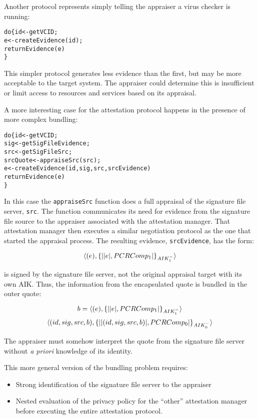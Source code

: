 \documentclass[10pt]{article}
\begin{document}
Another protocol represents simply telling the appraiser a virus
checker is running:

\begin{alltt}
  do \{ id <- getVCID;
       e <- createEvidence(id);
       returnEvidence(e)
  \}
\end{alltt}

This simpler protocol generates less evidence than the first, but may
be more acceptable to the target system.  The appraiser could
determine this is insufficient or limit access to resources and
services based on its appraisal.


A more interesting case for the attestation protocol happens in the
presence of more complex bundling:

\begin{alltt}
  do \{ id <- getVCID;
       sig <- getSigFileEvidence;
       src <- getSigFileSrc;
       srcQuote <- appraiseSrc(src);
       e <- createEvidence(id,sig,src,srcEvidence)
       returnEvidence(e)
  \}
\end{alltt}

In this case the \Verb+appraiseSrc+ function does a full appraisal of
the signature file server, \Verb+src+. The function communicates its
need for evidence from the signature file source to the appraiser
associated with the attestation manager.  That attestation manager
then executes a similar negotiation protocol as the one that started
the appraisal process.  The resulting evidence, \Verb+srcEvidence+,
has the form:

\[\langle (e),\{\lvert \lvert e \rvert,PCRComp_1\rvert\}_{AIK_1^{-}}\rangle\]

is signed by the signature file server, not the original appraisal
target with its own AIK. Thus, the information from the encapsulated
quote is bundled in the outer quote:

\[b=\langle (e),\{\lvert \lvert e \rvert,PCRComp_1\rvert\}_{AIK_1^{-}}\rangle\]
\[\langle (id,sig,src,b),\{\lvert \lvert (id,sig,src,b) \rvert,PCRComp_0\rvert\}_{AIK_0^{-}}\rangle\]

The appraiser must somehow interpret the quote from the signature file
server without \emph{a priori} knowledge of its identity.

This more general version of the bundling problem requires:

\begin{itemize}
  \parskip=0pt\itemsep=0pt
\item Strong identification of the signature file server to the appraiser
\item Nested evaluation of the privacy policy for the ``other''
  attestation manager before executing the entire attestation
  protocol.
\end{itemize}
\end{document}

